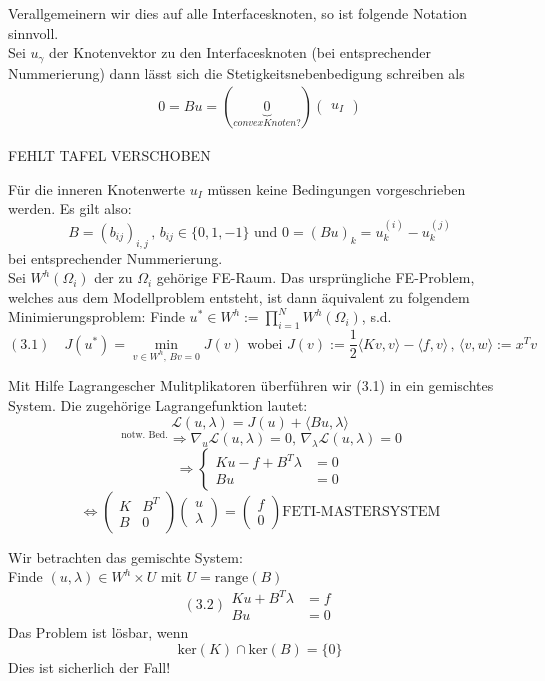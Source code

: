 Verallgemeinern wir dies auf alle Interfacesknoten, so ist folgende Notation sinnvoll. \\
Sei $u_\gamma$ der Knotenvektor zu den Interfacesknoten (bei entsprechender Nummerierung) dann lässt sich die Stetigkeitsnebenbedigung schreiben als 
\begin{align}
  0 = Bu = (\underbrace{0}_{convex Knoten?})
  \begin{pmatrix}
    u_I 
  \end{pmatrix}
  \label{}
\end{align}

FEHLT TAFEL VERSCHOBEN

Für die inneren Knotenwerte $u_I$ müssen keine Bedingungen vorgeschrieben werden. Es gilt also:
\[ B=(b_{ij})_{i,j}\, , \, b_{ij}\in \{ 0,1,-1 \} \text{ und } 0 = (Bu)_k=u^{(i)}_k - u^{(j)}_k \]
bei entsprechender Nummerierung.\\

Sei $W^h(\Omega_i)$ der zu $\Omega_i$ gehörige FE-Raum. Das ursprüngliche FE-Problem, welches aus dem Modellproblem entsteht, ist dann äquivalent zu folgendem Minimierungsproblem:
Finde $u^* \in W^h := \prod_{i=1}^N W^h (\Omega_i)$, s.d.
\[(3.1) \quad J(u^*) = \min_{v \in W^h, \, Bv=0} J(v) \text{ wobei } J(v):=\frac{1}{2} \langle Kv,v\rangle - \langle f,v \rangle\, , \, \langle v , w \rangle := x^Tv \]

Mit Hilfe Lagrangescher Mulitplikatoren überführen wir (3.1) in ein gemischtes System. Die zugehörige Lagrangefunktion lautet:
\[ \mathcal{L}(u,\lambda)=J(u)+\langle Bu,\lambda \rangle \]
\[^{\text{ notw. Bed.}}\Rightarrow \nabla_u \mathcal{L} (u,\lambda)=0,\, \nabla_\lambda \mathcal{L} (u,\lambda)=0  \]
\[\Rightarrow 
  \begin{cases} 
    Ku-f+B^T\lambda &=0 \\
    Bu &= 0
  \end{cases}
\]
\[ 
  \Leftrightarrow
  \begin{pmatrix}
    K & B^T \\
    B & 0 
  \end{pmatrix} 
  \begin{pmatrix}
    u \\
    \lambda 
  \end{pmatrix} 
  = 
  \begin{pmatrix} 
    f \\
    0 
  \end{pmatrix}  
  \boxed{\text{FETI-MASTERSYSTEM}} 
\]

Wir betrachten das gemischte System:\\
Finde $(u,\lambda) \in W^h \times U $ mit $U=\text{range}(B)$
\begin{equation}
(3.2) \begin{aligned}Ku+B^T\lambda &= f \\ Bu &= 0 \end{aligned}
\end{equation}
Das Problem ist lösbar, wenn
\[ \text{ker}(K)\cap \text{ker}(B) = \{ 0 \} \]
Dies ist sicherlich der Fall!\\

